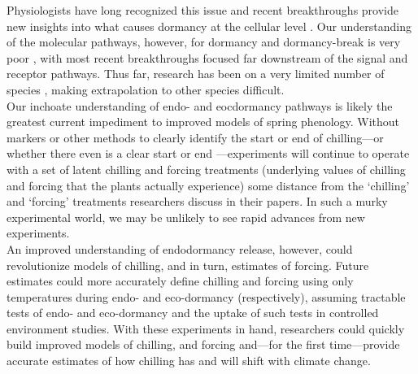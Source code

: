 \documentclass[11pt,letter]{article}
\newcommand{\R}[1]{\label{#1}\linelabel{#1}}
\begin{document}
Physiologists have long recognized this issue and recent breakthroughs provide new insights into what causes dormancy at the cellular level \citep{vanderschoot2014}. \R{r2moredormstart}Our understanding of the molecular pathways, however, for dormancy and dormancy-break is very poor \citep[especially when compared to our understanding of flowering time pathways,][]{Azeez2021}, with most recent breakthroughs  focused far downstream of the signal and receptor pathways. Thus far, research has been on a very limited number of species \citep{Singh:2017,rinne2018}, making extrapolation to other species difficult. \\ %

Our inchoate understanding of endo- and eocdormancy pathways is likely the greatest current impediment to improved models of spring phenology. Without markers or other methods to clearly identify the start or end of chilling---or whether there even is a clear start or end \citep[as opposed to potential parallel models of chilling and forcing,][]{harrington2015}---experiments will continue to operate with a set of latent chilling and forcing treatments (underlying values of chilling and forcing that the plants actually experience) some distance from the `chilling' and `forcing' treatments researchers discuss in their papers. In such a murky experimental world, we may be unlikely to see rapid advances from new experiments. \R{r2moredormend}\\

An improved understanding of endodormancy release, however, could revolutionize models of chilling, and in turn, estimates of forcing. Future estimates could more accurately define chilling and forcing using only temperatures during endo- and eco-dormancy (respectively), assuming tractable tests of endo- and eco-dormancy and the uptake of such tests in controlled environment studies. With these experiments in hand, researchers could quickly build improved models of chilling, and forcing and---for the first time---provide accurate estimates of how chilling has and will shift with climate change.\\ %
\end{document}
